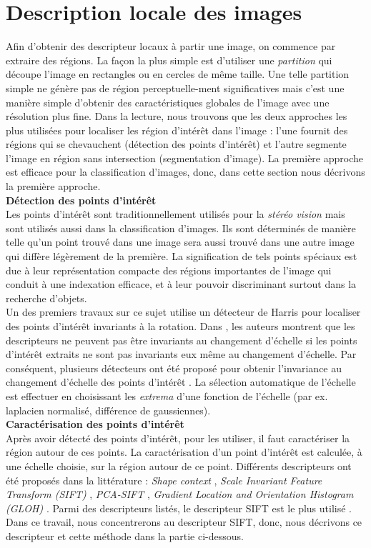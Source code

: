 \section{Description locale des images}
Afin d'obtenir des descripteur locaux à partir une image, on commence par extraire des régions. La façon la plus simple est d'utiliser une \textit{partition} qui découpe l'image en rectangles ou en cercles de même taille. Une telle partition simple ne génère pas de région perceptuelle-ment significatives mais c'est une manière simple d'obtenir des caractéristiques globales de l'image avec une résolution plus fine. Dans la lecture, nous trouvons que les deux approches les plus utilisées pour localiser les région d'intérêt dans l'image : l'une fournit des régions qui se chevauchent (détection des points d'intérêt) et l'autre segmente l'image en région sans intersection (segmentation d'image)\cite{khang09}. La première approche est efficace pour la classification d'images, donc, dans cette section nous décrivons la première approche.\\[0.5cm]
\textbf{Détection des points d'intérêt}\\
Les points d'intérêt sont traditionnellement utilisés pour la \textit{stéréo vision} mais sont utilisés aussi dans la classification d'images. Ils sont déterminés de manière telle qu'un point trouvé dans une image sera aussi trouvé dans une autre image qui diffère légèrement de la première. La signification de tels points spéciaux est due à leur représentation compacte des régions importantes de l'image qui conduit à une indexation efficace, et à leur pouvoir discriminant surtout dans la recherche d'objets.\\

Un des premiers travaux sur ce sujet \cite{sm97} utilise un détecteur de Harris \cite{hs88} pour localiser des points d'intérêt invariants à la rotation. Dans \cite{dsh00}, les auteurs montrent que les descripteurs ne peuvent pas être invariants au changement d'échelle si les points d'intérêt extraits ne sont pas invariants eux même au changement d'échelle. Par conséquent, plusieurs détecteurs ont été proposé pour obtenir l'invariance au changement d'échelle des points d'intérêt \cite{lin98, low99, ms01, low04}. La sélection automatique de l'échelle est effectuer en choisissant les \textit{extrema} d'une fonction de l'échelle (par ex. laplacien normalisé, différence de gaussiennes).\\[0.5cm]
\textbf{Caractérisation des points d'intérêt}\\
Après avoir détecté des points d'intérêt, pour les utiliser, il faut caractériser la région autour de ces points. La caractérisation d'un point d'intérêt est calculée, à une échelle choisie, sur la région autour de ce point. Différents descripteurs ont été proposés dans la littérature : \textit{Shape context} \cite{bmp02}, \textit{Scale Invariant Feature Transform (SIFT)} \cite{low04}, \textit{PCA-SIFT} \cite{ks04}, \textit{Gradient Location and Orientation Histogram (GLOH)} \cite{ms05}. Parmi des descripteurs listés, le descripteur SIFT est le plus utilisé \cite{khang09}. Dans ce travail, nous concentrerons au descripteur SIFT, donc, nous décrivons ce descripteur et cette méthode dans la partie ci-dessous.

